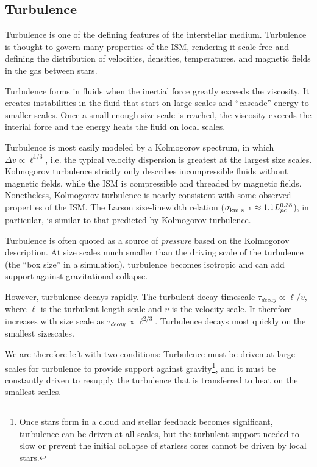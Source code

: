 \subsection{Turbulence}
Turbulence is one of the defining features of the interstellar medium.
Turbulence is thought to govern many properties of the ISM, rendering it
scale-free and defining the distribution of velocities, densities,
temperatures, and magnetic fields in the gas between stars.

Turbulence forms in fluids when the inertial force greatly exceeds the
viscosity.  It creates instabilities in the fluid that start on large scales
and ``cascade'' energy to smaller scales.  Once a small enough size-scale is
reached, the viscosity exceeds the interial force and the energy heats the
fluid on local scales.

Turbulence is most easily modeled by a Kolmogorov spectrum, in which $\Delta v
\propto \ell^{1/3}$, i.e. the typical velocity dispersion is greatest at the
largest size scales.  Kolmogorov turbulence strictly only describes
incompressible fluids without magnetic fields, while the ISM is compressible
and threaded by magnetic fields.  Nonetheless, Kolmogorov turbulence is nearly
consistent with some observed properties of the ISM.  The Larson size-linewidth
relation ($\sigma_{\textrm{km~s}^{-1}}\approx1.1 L_{pc}^{0.38}$), in particular, is similar
to that predicted by Kolmogorov turbulence.

Turbulence is often quoted as a source of \emph{pressure} based on the
Kolmogorov description.  At size scales much smaller than the driving scale of
the turbulence (the ``box size'' in a simulation), turbulence becomes isotropic
and can add support against gravitational collapse.  

However, turbulence decays rapidly.  The turbulent decay timescale
$\tau_{decay}\propto \ell / v$, where $\ell$ is the turbulent length scale and $v$ is
the velocity scale.  It therefore increases with size scale as
$\tau_{decay}\propto \ell^{2/3}$.  Turbulence decays most quickly on the smallest
sizescales.

We are therefore left with two conditions: Turbulence must be driven at large
scales for turbulence to provide support against gravity\footnote{Once stars form
in a cloud and stellar feedback becomes significant, turbulence can be driven at all
scales, but the turbulent support needed to slow or prevent the initial
collapse of starless cores cannot be driven by local stars.}, and it must be
constantly driven to resupply the turbulence that is transferred to heat on the
smallest scales.

